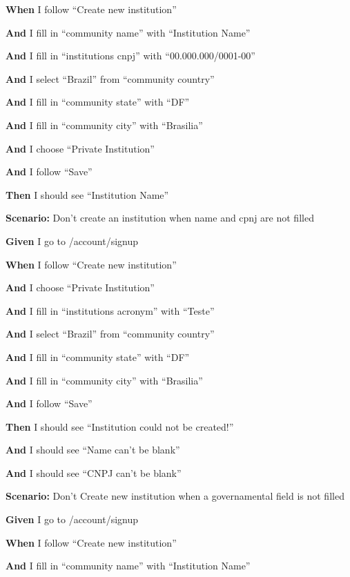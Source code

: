     \textbf{When} I follow ``Create new institution''

    \textbf{And }I fill in ``community name'' with ``Institution Name''

    \textbf{And }I fill in ``institutions cnpj'' with ``00.000.000/0001-00''

    \textbf{And }I select ``Brazil'' from ``community country''

    \textbf{And }I fill in ``community state'' with ``DF''

    \textbf{And }I fill in ``community city'' with ``Brasilia''

    \textbf{And }I choose ``Private Institution''

    \textbf{And }I follow ``Save''

    \textbf{Then} I should see ``Institution Name''

      
  
  \textbf{Scenario:} Don't create an institution when name and cpnj are not filled

    \textbf{Given} I go to /account/signup

    \textbf{When} I follow ``Create new institution''

    \textbf{And }I choose ``Private Institution''

    \textbf{And }I fill in ``institutions acronym'' with ``Teste''

    \textbf{And }I select ``Brazil'' from ``community country''

    \textbf{And }I fill in ``community state'' with ``DF''

    \textbf{And }I fill in ``community city'' with ``Brasilia''

    \textbf{And }I follow ``Save''

    \textbf{Then} I should see ``Institution could not be created!''

    \textbf{And }I should see ``Name can't be blank''

    \textbf{And }I should see ``CNPJ can't be blank''



  \textbf{Scenario:} Don't Create new institution when a governamental field is not filled

    \textbf{Given} I go to /account/signup

    \textbf{When} I follow ``Create new institution''

    \textbf{And }I fill in ``community name'' with ``Institution Name''

